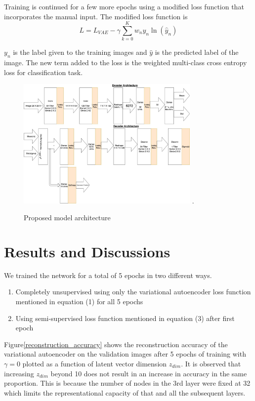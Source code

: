 \documentclass{uai2021} %
\begin{document}
Training is continued for a few more epochs using a modified loss function that incorporates the manual input.
The modified loss function is
\begin{equation}
L = L_{VAE}  - \gamma \sum_{k=0}^{K}w_{n}y_{n}\ln(\hat{y}_{n})
\end{equation}

$y_n$ is the label given to the training images and $\hat{y}$ is the predicted label of the image.
The new term added to the loss is the weighted multi-class cross entropy loss for classification task.

\begin{figure}[!t]
\centering
\includegraphics[width=3.5in]{vae_model_architecture_classification.jpg}
\DeclareGraphicsExtensions.
\caption{Proposed model architecture}
\label{vae_architecture}
\end{figure}

\section{Results and Discussions} \label{results}

We trained the network for a total of 5 epochs in two different ways.
\begin{enumerate}
    \item Completely unsupervised using only the variational autoencoder loss function mentioned in equation (1) for all 5 epochs
    \item Using semi-supervised loss function mentioned in equation (3) after first epoch
\end{enumerate}


Figure\ref{reconstruction_accuracy} shows  the reconstruction accuracy of the variational autoencoder on the validation images after 5 epochs of training with $\gamma = 0$  plotted as a function of latent vector dimension $z_{dim}$.
It is observed that increasing $z_{dim}$ beyond 10 does not result in an increase in accuracy in the same proportion.
This is because the number of nodes in the 3rd layer were fixed at 32 which limits the representational capacity of that and all the subsequent layers.
\end{document}
